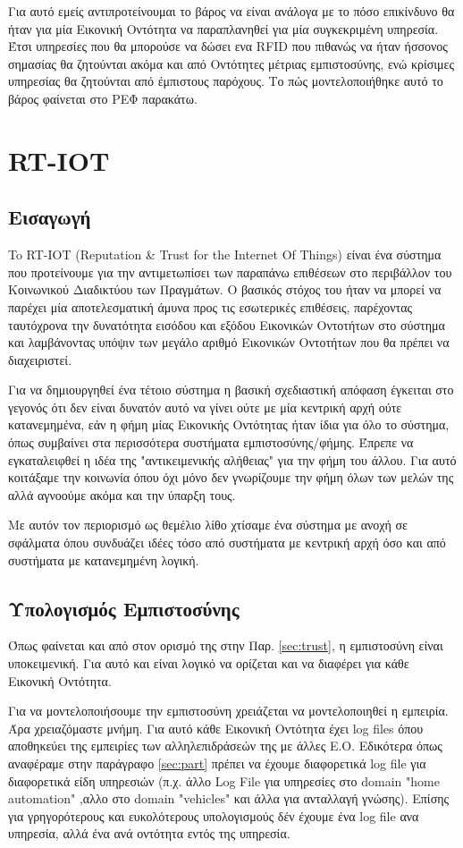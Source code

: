 Για αυτό εμείς αντιπροτείνουμαι το βάρος να είναι ανάλογα με το πόσο επικίνδυνο θα ήταν για μία Εικονική Οντότητα να παραπλανηθεί για μία συγκεκριμένη υπηρεσία. Έτσι υπηρεσίες που θα μπορούσε να δώσει ενα RFID  που πιθανώς να ήταν ήσσονος σημασίας θα ζητούνται ακόμα και από Οντότητες μέτριας εμπιστοσύνης, ενώ κρίσιμες υπηρεσίας θα ζητούνται από έμπιστους παρόχους. Το πώς μοντελοποιήθηκε αυτό το βάρος φαίνεται στο ΡΕΦ παρακάτω.
\newpage

\section{RT-IOT}
\subsection{Εισαγωγή}
To RT-IOT (Reputation \& Trust for the Internet Of Things) είναι ένα σύστημα που προτείνουμε για την αντιμετωπίσει των παραπάνω επιθέσεων στο περιβάλλον του Κοινωνικού Διαδικτύου των Πραγμάτων. Ο βασικός στόχος του ήταν να μπορεί να παρέχει μία αποτελεσματική άμυνα προς τις εσωτερικές επιθέσεις, παρέχοντας ταυτόχρονα την δυνατότητα εισόδου και εξόδου Εικονικών Οντοτήτων στο σύστημα 
και λαμβάνοντας υπόψιν των μεγάλο αριθμό Εικονικών Οντοτήτων που θα πρέπει να διαχειριστεί.

Για να δημιουργηθεί ένα τέτοιο σύστημα η βασική σχεδιαστική απόφαση έγκειται στο γεγονός ότι δεν είναι δυνατόν αυτό να γίνει ούτε με μία κεντρική αρχή ούτε κατανεμημένα, εάν η φήμη μίας Εικονικής Οντότητας ήταν ίδια για όλο το σύστημα, όπως συμβαίνει στα περισσότερα συστήματα εμπιστοσύνης/φήμης. Έπρεπε να εγκαταλειφθεί η ιδέα της "αντικειμενικής αλήθειας" για την φήμη του άλλου. Για αυτό κοιτάξαμε την κοινωνία όπου όχι μόνο δεν γνωρίζουμε την φήμη όλων των μελών της αλλά αγνοούμε ακόμα και την ύπαρξη τους.

Με αυτόν τον περιορισμό ως θεμέλιο λίθο χτίσαμε ένα σύστημα με ανοχή σε σφάλματα όπου συνδυάζει ιδέες τόσο από συστήματα με κεντρική αρχή όσο και από συστήματα με κατανεμημένη λογική.

\subsection{Υπολογισμός Εμπιστοσύνης}
Όπως φαίνεται και από στον ορισμό της στην Παρ. \ref{sec:trust}, η εμπιστοσύνη είναι υποκειμενική. Για αυτό και είναι λογικό να ορίζεται και να διαφέρει για κάθε Εικονική Οντότητα.

Για να μοντελοποιήσουμε την εμπιστοσύνη χρειάζεται να μοντελοποιηθεί η εμπειρία. Άρα χρειαζόμαστε μνήμη. Για αυτό κάθε Εικονική Οντότητα έχει log files όπου αποθηκεύει της εμπειρίες των αλληλεπιδράσεών της με άλλες Ε.Ο. Εδικότερα όπως αναφέραμε στην παράγραφο \ref{sec:part} πρέπει να έχουμε διαφορετικά log file για διαφορετικά είδη υπηρεσιών (π.χ. άλλο Log File για υπηρεσίες στο domain "home automation" ,αλλο  στο domain "vehicles" και άλλα για ανταλλαγή γνώσης). Επίσης για γρηγορότερους και ευκολότερους υπολογισμούς δέν έχουμε ένα log file ανα υπηρεσία, αλλά ένα ανά οντότητα εντός της υπηρεσία.

